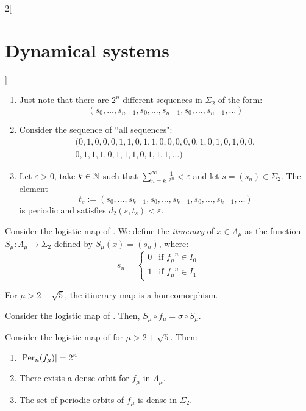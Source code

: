 \documentclass[../../../main_math.tex]{subfiles}
\begin{document}
\begin{multicols}{2}[\section{Dynamical systems}]
\begin{sproof}
    \begin{enumerate}
      \item Just note that there are $2^n$ different sequences in $\Sigma_2$ of the form:
            $$(s_0,\ldots,s_{n-1},s_0,\ldots,s_{n-1},s_0,\ldots,s_{n-1},\ldots)$$
      \item Consider the sequence of ``all sequences":
            \begin{multline*}
              (0,1,0,0,0,1,1,0,1,1,0,0,0,0,0,1,0,1,0,1,0,0,\\ 0,1,1,1,0,1,1,1,0,1,1,1,\ldots)
            \end{multline*}
      \item Let $\varepsilon>0$, take $k\in\mathbb{N}$ such that $\sum_{n=k}^{\infty}\frac{1}{2^n}<\varepsilon$ and let $s=(s_n)\in\Sigma_2$. The element $$t_s:=(s_0,\ldots,s_{k-1},s_0,\ldots,s_{k-1},s_0,\ldots,s_{k-1},\ldots)$$
            is periodic and satisfies $d_2(s,t_s)<\varepsilon$.
    \end{enumerate}
  \end{sproof}
  \begin{definition}
    Consider the logistic map of . We define the \emph{itinerary} of $x\in\Lambda_\mu$ as the function $S_\mu:\Lambda_\mu\rightarrow\Sigma_2$ defined by $S_\mu(x)=(s_n)$, where:
    $$s_n=
      \begin{cases}
        0 & \text{if ${f_\mu}^n\in I_0$} \\
        1 & \text{if ${f_\mu}^n\in I_1$}
      \end{cases}
    $$
  \end{definition}
  \begin{proposition}
    For $\mu>2+\sqrt{5}$, the itinerary map is a homeomorphism.
  \end{proposition}
  \begin{theorem}
    Consider the logistic map of . Then, $S_\mu\circ f_\mu=\sigma\circ S_\mu$.
  \end{theorem}
  \begin{corollary}
    Consider the logistic map of  for $\mu>2+\sqrt{5}$. Then:
    \begin{enumerate}
      \item $\abs{\operatorname{Per}_n(f_\mu)}=2^n$
      \item There exists a dense orbit for $f_\mu$ in $\Lambda_\mu$.
      \item The set of periodic orbits of $f_\mu$ is dense in $\Sigma_2$.
    \end{enumerate}
  \end{corollary}

\end{multicols}
\end{document}
